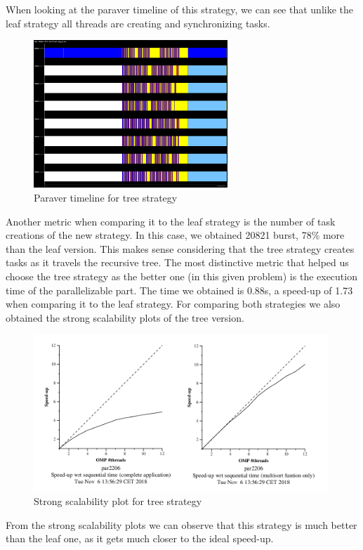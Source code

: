 \documentclass{article}
\begin{document}
\justify
When looking at the paraver timeline of this strategy, we can see that unlike the leaf strategy all threads are creating and synchronizing tasks.
\begin{figure}[!h]
    \centering
    \includegraphics[width=0.65\textwidth]{paraver_noCFG_treeNC.png}
    \caption{Paraver timeline for tree strategy}
    \label{fig:}
\end{figure}

\justify

Another metric when comparing it to the leaf strategy is the number of task creations of the new strategy. In this case, we obtained 20821 burst, 78\% more than the leaf version. This makes sense considering that the tree strategy creates tasks as it travels the recursive tree.
\justify
The most distinctive metric that helped us choose the tree strategy as the better one (in this given problem) is the execution time of the parallelizable part. The time we obtained is 0.88s, a speed-up of 1.73 when comparing it to the leaf strategy.
\clearpage
\justify
For comparing both strategies we also obtained the strong scalability plots of the tree version.
\begin{figure}[!h]
    \centering
    \includegraphics[width=0.99\textwidth]{treeStrongNC.png}
    \caption{Strong scalability plot for tree strategy}
    \label{fig:}
\end{figure}
\justify
From the strong scalability plots we can observe that this strategy is much better than the leaf one, as it gets much closer to the ideal speed-up. 
\end{document}
